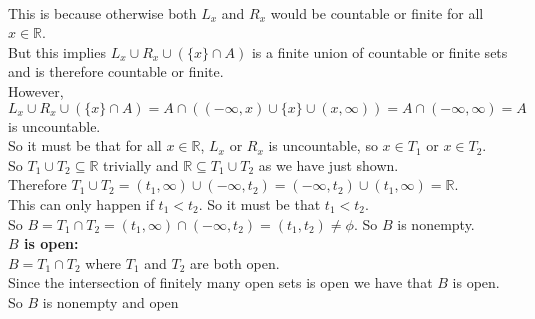 \documentclass{article}
\begin{document}
\begin{center}
\begin{itemize}
        \\This is because otherwise both $L_x$ and $R_x$ would be countable or finite for all $x\in\mathbb{R}$.
        \\But this implies $L_x\cup R_x\cup (\{x\}\cap A)$ is a finite union of countable or finite sets and is therefore countable or finite.
        \\However, $L_x\cup R_x\cup (\{x\}\cap A) = A\cap ((-\infty, x)\cup\{x\}\cup (x, \infty)) = A\cap (-\infty, \infty) = A$ is uncountable.
        \\So it must be that for all $x\in\mathbb{R}$, $L_x$ or $R_x$ is uncountable, so $x\in T_1$ or $x\in T_2$.
        \\So $T_1\cup T_2\subseteq\mathbb{R}$ trivially and $\mathbb{R}\subseteq T_1\cup T_2$ as we have just shown.
        \\Therefore $T_1\cup T_2 =(t_1, \infty)\cup (-\infty, t_2) = (-\infty, t_2)\cup (t_1, \infty) =\mathbb{R}$.
        \\This can only happen if $t_1 < t_2$. So it must be that $t_1 < t_2$.
        \\So $B = T_1\cap T_2 = (t_1, \infty)\cap (-\infty, t_2) = (t_1, t_2)\neq\phi$. So $B$ is nonempty.
        \\\textbf{$B$ is open:}
        \\$B = T_1\cap T_2$ where $T_1$ and $T_2$ are both open.
        \\Since the intersection of finitely many open sets is open we have that $B$ is open.
        \\So $B$ is nonempty and open \qedsymbol
    \end{itemize}
\end{center}
\end{document}
